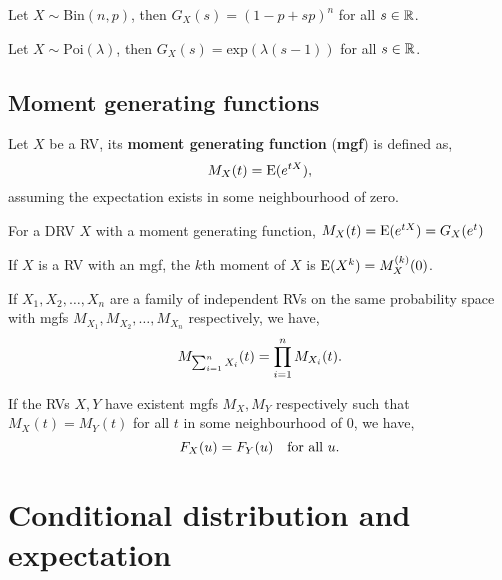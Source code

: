 \begin{example}
    Let $X\sim\text{Bin}(n,p)$, then $G_X(s) = (1-p+sp)^n$ for all $s\in\mathbb{R}$.
\end{example}

\begin{example}
    Let $X\sim\text{Poi}(\lambda)$, then $G_X(s) = \text{exp}(\lambda(s-1))$ for all $s\in\mathbb{R}$.
\end{example}
\subsection{Moment generating functions}
\begin{definition}
    Let $X$ be a RV, its \textbf{moment generating function} (\textbf{mgf}) is defined as, \[
        M_X(t)=\mathrm{E}(e^{tX})\textcolor{black}{,}
    \]
    assuming the expectation exists in some neighbourhood of zero.
\end{definition}

\begin{remark}
    For a DRV $X$ with a moment generating function, $M_X(t)=\mathrm{E}(e^{tX})=G_X(e^t)$
\end{remark}

\begin{theorem}
    If $X$ is a RV with an mgf, the $k$th moment of $X$ is $\mathrm{E}(X^k)=M_X^{(k)}(0)$.
\end{theorem}

\begingroup\belowdisplayskip=-00pt
\begin{theorem}
    If $X_1,X_2,\ldots,X_n$ are a family of independent RVs on the same probability space with mgfs $M_{X_1},M_{X_2},\ldots,M_{X_n}$ respectively, we have, \[
        M_{\sum_{i=1}^nX_i}(t)=\prod_{i=1}^nM_{X_i}(t)\textcolor{black}{.}
    \]
\end{theorem}
\endgroup
\begingroup\belowdisplayskip=-20pt
\begin{theorem}
    If the RVs $X,Y$ have existent mgfs $M_X,M_Y$ respectively such that $M_X(t)=M_Y(t)$ for all $t$ in some neighbourhood of $0$, we have, \[
        F_X(u)=F_Y(u) \quad
        \text{\textcolor{black}{ for all }}u\textcolor{black}{.}
    \]
\end{theorem}
\endgroup

\section{Conditional distribution and expectation}
